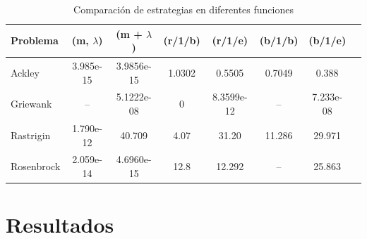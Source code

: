 \documentclass{report}
\begin{document}
\begin{table}[ht]
\centering
\caption{Comparación de estrategias en diferentes funciones}
\begin{tabular}{>{\raggedright}p{3cm}ccccccc}
\toprule
\textbf{Problema} & \textbf{(m, $\lambda$)} & \textbf{(m + $\lambda$)} & \textbf{(r/1/b)} & \textbf{(r/1/e)} & \textbf{(b/1/b)} & \textbf{(b/1/e)} \\
\midrule
Ackley & 3.985e-15 & 3.9856e-15 & 1.0302 & 0.5505 & 0.7049 & 0.388 \\
Griewank & -- & 5.1222e-08 & 0 & 8.3599e-12 & -- & 7.233e-08 \\
Rastrigin & 1.790e-12 & 40.709 & 4.07 & 31.20 & 11.286 & 29.971 \\
Rosenbrock & 2.059e-14 & 4.6960e-15 & 12.8 & 12.292 & -- & 25.863 \\
\bottomrule
\end{tabular}
\end{table}

\section{Resultados}
\end{document}

